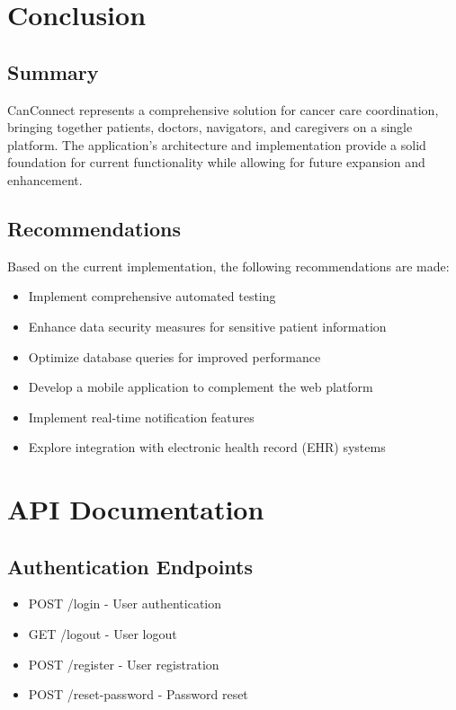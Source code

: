 \documentclass[12pt,a4paper]{report}
\begin{document}
\chapter{Conclusion}

\section{Summary}
CanConnect represents a comprehensive solution for cancer care coordination, bringing together patients, doctors, navigators, and caregivers on a single platform. The application's architecture and implementation provide a solid foundation for current functionality while allowing for future expansion and enhancement.

\section{Recommendations}
Based on the current implementation, the following recommendations are made:

\begin{itemize}
    \item Implement comprehensive automated testing
    \item Enhance data security measures for sensitive patient information
    \item Optimize database queries for improved performance
    \item Develop a mobile application to complement the web platform
    \item Implement real-time notification features
    \item Explore integration with electronic health record (EHR) systems
\end{itemize}

\appendix
\chapter{API Documentation}

\section{Authentication Endpoints}
\begin{itemize}
    \item POST /login - User authentication
    \item GET /logout - User logout
    \item POST /register - User registration
    \item POST /reset-password - Password reset
\end{itemize}
\end{document}
